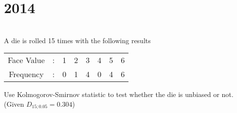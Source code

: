 \section*{2014}
\vspace{-.5cm}
\hrulefill \smallskip\\
 A die is rolled 15 times with the following results
\begin{center}
    \begin{tabular}{*{8}{c}}
        Face Value & : & 1 & 2 & 3 & 4 & 5 & 6 \\
        Frequency  & : & 0 & 1 & 4 & 0 & 4 & 6
    \end{tabular}
\end{center} Use Kolmogorov-Smirnov statistic to test whether the die is unbiased or not. (Given $D_{15; 0.05} = 0.304$)